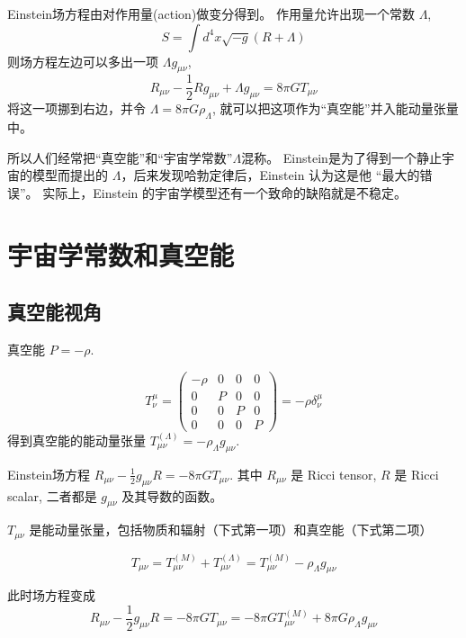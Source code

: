 \documentclass[12pt]{ctexart}
\begin{document}
Einstein场方程由对作用量(action)做变分得到。
作用量允许出现一个常数 $\Lambda$, 
\begin{equation}
    S = \int d^4 x \sqrt{-g} (R + \Lambda)
\end{equation}
则场方程左边可以多出一项 $\Lambda g_{\mu \nu}$,
\begin{equation}
    R_{\mu \nu} - \frac{1}{2} R g_{\mu \nu} + \Lambda g_{\mu \nu}= 8 \pi G T_{\mu \nu}
\end{equation}
将这一项挪到右边，并令 $\Lambda = 8 \pi G \rho_\Lambda$, 就可以把这项作为“真空能”并入能动量张量中。

所以人们经常把“真空能”和“宇宙学常数”$\Lambda$混称。
Einstein是为了得到一个静止宇宙的模型而提出的 $\Lambda$，后来发现哈勃定律后，Einstein 认为这是他 “最大的错误”。
实际上，Einstein 的宇宙学模型还有一个致命的缺陷就是不稳定。

\section{宇宙学常数和真空能}

\subsection{真空能视角}
真空能 $P=-\rho$.

\begin{equation} 
    T^\mu_{\nu} = \left(\begin{array}{llll}-\rho & 0 & 0 & 0 \\ 0 & P & 0 & 0 \\ 0& 0& P &0 \\ 0 & 0&0&P\end{array}\right) = -\rho \delta^\mu_{\nu}
\end{equation}
得到真空能的能动量张量 $T_{\mu\nu}^{(\Lambda)}=- \rho_\Lambda g_{\mu\nu}$.

Einstein场方程 $R_{\mu\nu} - \frac{1}{2} g_{\mu\nu} R = -8\pi G T_{\mu\nu}$.
其中 $R_{\mu\nu}$ 是 Ricci tensor,  $R$ 是 Ricci scalar, 二者都是  $g_{\mu\nu}$ 及其导数的函数。

$T_{\mu\nu}$ 是能动量张量，包括物质和辐射（下式第一项）和真空能（下式第二项）

\begin{equation}
    T_{\mu\nu} = T_{\mu\nu}^{(M)} + T_{\mu\nu}^{(\Lambda)} = T_{\mu\nu}^{(M)} - \rho_\Lambda g_{\mu\nu}
\end{equation}

此时场方程变成 
\begin{equation} \label{Eeq.vacuum}
    R_{\mu\nu} - \frac{1}{2} g_{\mu\nu} R = -8\pi G T_{\mu\nu} =  -8\pi G T_{\mu\nu}^{(M)} +  8\pi G \rho_\Lambda g_{\mu\nu}
\end{equation}
\end{document}
